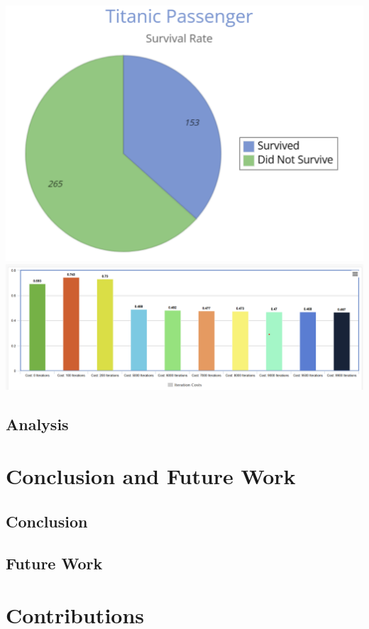 \documentclass{IEEE}
\begin{document}
\includegraphics[scale=0.4]{./piechart.png}
\\ \includegraphics[scale=0.4]{./barchart.png}
\subsection{Analysis}



\section{Conclusion and Future Work}

\subsection{Conclusion}

\subsection{Future Work}





\section{Contributions}
\end{document}
